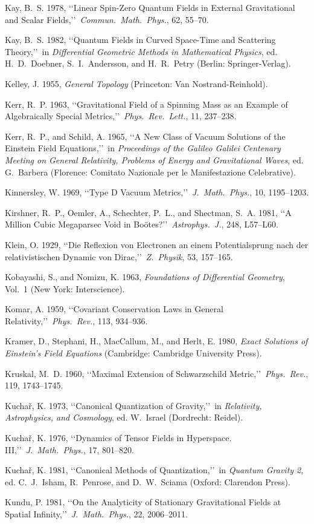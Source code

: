 \item Kay, B.~S. 1978, \lq\lq Linear Spin-Zero Quantum Fields in External Gravitational and Scalar Fields,\rq\rq\ \emph{Commun.\ Math.\ Phys.}, 62, 55--70.
\item Kay, B.~S. 1982, \lq\lq Quantum Fields in Curved Space-Time and Scattering Theory,\rq\rq\ in \emph{Differential Geometric Methods in Mathematical Physics}, ed. H.~D.~Doebner, S.~I.~Andersson, and H.~R.~Petry (Berlin: Springer-Verlag).
\item Kelley, J. 1955, \emph{General Topology} (Princeton: Van Nostrand-Reinhold).
\item Kerr, R.~P. 1963, \lq\lq Gravitational Field of a Spinning Mass as an Example of Algebraically Special Metrics,\rq\rq\ \emph{Phys.\ Rev.\ Lett.}, 11, 237--238.
\item Kerr, R.~P., and Schild, A. 1965, \lq\lq A New Class of Vacuum Solutions of the Einstein Field Equations,\rq\rq\ in \emph{Proceedings of the Galileo Galilei Centenary Meeting on General Relativity, Problems of Energy and Gravitational Waves}, ed. G.~Barbera (Florence: Comitato Nazionale per le Manifestazione Celebrative).
\item Kinnersley, W. 1969, \lq\lq Type D Vacuum Metrics,\rq\rq\ \emph{J.\ Math.\ Phys.}, 10, 1195--1203.
\item Kirshner, R.~P., Oemler, A., Schechter, P.~L., and Shectman, S.~A. 1981, \lq\lq A Million Cubic Megaparsec Void in Bo{\"o}tes?\rq\rq\ \emph{Astrophys.\ J.}, 248, L57--L60.
\item Klein, O. 1929, \lq\lq Die Reflexion von Electronen an einem Potentialsprung nach der relativistischen Dynamic von Dirac,\rq\rq\ \emph{Z.\ Physik}, 53, 157--165.
\item Kobayashi, S., and Nomizu, K. 1963, \emph{Foundations of Differential Geometry}, Vol.~1 (New York: Interscience).
\item Komar, A. 1959, \lq\lq Covariant Conservation Laws in General Relativity,\rq\rq\ \emph{Phys.\ Rev.}, 113, 934--936.
\item Kramer, D., Stephani, H., MacCallum, M., and Herlt, E. 1980, \emph{Exact Solutions of Einstein's Field Equations} (Cambridge: Cambridge University Press).
\item Kruskal, M.~D. 1960, \lq\lq Maximal Extension of Schwarzschild Metric,\rq\rq\ \emph{Phys.\ Rev.}, 119, 1743--1745.
\item Kucha{\v r}, K. 1973, \lq\lq Canonical Quantization of Gravity,\rq\rq\ in \emph{Relativity, Astrophysics, and Cosmology}, ed. W.~Israel (Dordrecht: Reidel).
\item Kucha{\v r}, K. 1976, \lq\lq Dynamics of Tensor Fields in Hyperspace. III,\rq\rq\ \emph{J.\ Math.\ Phys.}, 17, 801--820.
\item Kucha{\v r}, K. 1981, \lq\lq Canonical Methods of Quantization,\rq\rq\ in \emph{Quantum Gravity 2}, ed. C.~J.~Isham, R.~Penrose, and D.~W.~Sciama (Oxford: Clarendon Press).
\item Kundu, P. 1981, \lq\lq On the Analyticity of Stationary Gravitational Fields at Spatial Infinity,\rq\rq\ \emph{J.\ Math.\ Phys.}, 22, 2006--2011.
